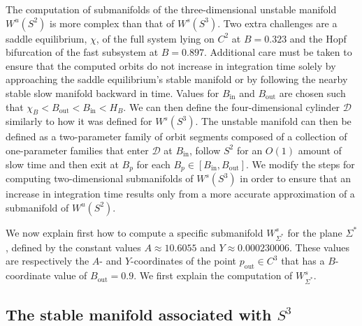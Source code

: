 \documentclass{ws-ijbc}
\begin{document}
The computation of submanifolds of the three-dimensional unstable manifold $W^u(S^2)$ is more complex than that of $W^s(S^3)$.  Two extra challenges are a saddle equilibrium, $\chi$, of the full system lying on $C^2$ at $B = 0.323$ and the Hopf bifurcation of the fast subsystem at $B = 0.897$.  Additional care must be taken to ensure that the computed orbits do not increase in integration time solely by approaching the saddle equilibrium's stable manifold or by following the nearby stable slow manifold backward in time.  Values for $B_{\mathrm{in}}$ and $B_{\mathrm{out}}$ are chosen such that $\chi_B < B_{\mathrm{out}} < B_{\mathrm{in}}< H_B$.  We can then define the four-dimensional cylinder $\mathscr{D}$ similarly to how it was defined for $W^s(S^3)$.  The unstable manifold can then be defined as a two-parameter family of orbit segments composed of a collection of one-parameter families that enter $\mathscr{D}$ at $B_{\mathrm{in}}$, follow $S^2$ for an $O(1)$ amount of slow time and then exit at $B_p$ for each $B_p \in [B_{\mathrm{in}}, B_{\mathrm{out}}]$.  We modify the steps for computing two-dimensional submanifolds of $W^s(S^3)$ in order to ensure that an increase in integration time results only from a more accurate approximation of a submanifold of $W^u(S^2)$.

We now explain first how to compute a specific submanifold $W^s_{\Sigma^*}$ for the plane $\Sigma^*$, defined by the constant values $A \approx 10.6055$ and $Y \approx 0.000230006$.  These values are respectively the $A$- and $Y$-coordinates of the point $p_{\text{out}} \in C^3$ that has a $B$-coordinate value of $B_{\text{out}}=0.9$.  We first explain the computation of $W^s_{\Sigma^*}$.


\subsection{The stable manifold associated with $S^3$}    
\end{document}
